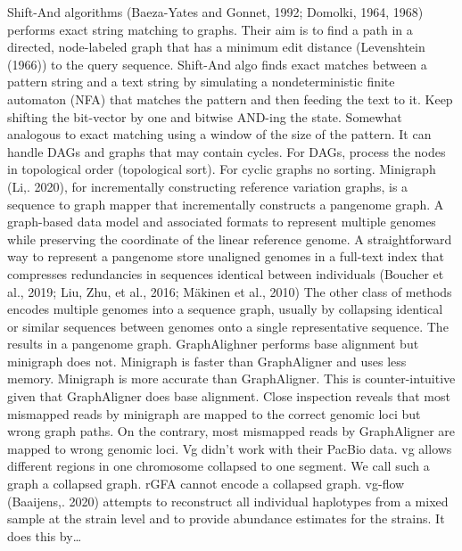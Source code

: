 \documentclass[11pt]{article}
\begin{document}
Shift-And algorithms (Baeza-Yates and Gonnet, 1992; Domolki, 1964, 1968) performs exact string matching to graphs. Their aim is to find a path in a directed, node-labeled graph that has a minimum edit distance (Levenshtein (1966)) to the query sequence. Shift-And algo finds exact matches between a pattern string and a text string by simulating a nondeterministic finite automaton (NFA) that matches the pattern and then feeding the text to it.
Keep shifting the bit-vector by one and bitwise AND-ing the state. Somewhat analogous to exact matching using a window of the size of the pattern.
It can handle DAGs and  graphs that may contain cycles. For DAGs, process the nodes in topological order (topological sort). For cyclic graphs no sorting.
Minigraph (Li,. 2020), for incrementally constructing reference variation graphs, is a sequence to graph mapper that incrementally constructs a pangenome graph. A graph-based data model and associated formats to represent multiple genomes while preserving the coordinate of the linear reference genome. A straightforward way to represent a pangenome store unaligned genomes in a full-text index that compresses redundancies in sequences identical between individuals (Boucher et al., 2019; Liu, Zhu, et al., 2016; Mäkinen et al., 2010) 		
The other class of methods encodes multiple genomes into a sequence graph, usually by collapsing identical or similar sequences between genomes onto a single representative sequence. The results in a pangenome graph.
GraphAlighner performs base alignment but minigraph does not. Minigraph is faster than GraphAligner and uses less memory. Minigraph is more accurate than GraphAligner. This is counter-intuitive given that GraphAligner does base alignment. Close inspection reveals that most mismapped reads by minigraph are mapped to the correct genomic loci but wrong graph paths. On the contrary, most mismapped reads by GraphAligner are mapped to wrong genomic loci. Vg didn’t work with their PacBio data. vg allows different regions in one chromosome collapsed to one segment. We call such a graph a collapsed graph. rGFA cannot encode a collapsed graph.
vg-flow (Baaijens,. 2020) attempts to reconstruct all individual haplotypes from a mixed sample at the strain level and to provide abundance estimates for the strains. It does this by\ldots{}
\end{document}
